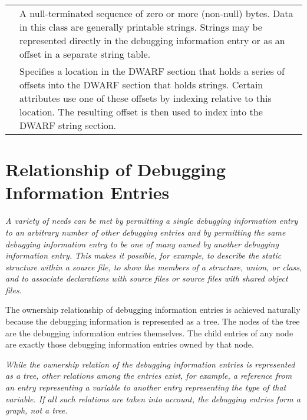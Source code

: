 \begin{longtable}{P{3cm}|P{11cm}}
\hypertarget{chap:classstring}{}
& A null-terminated sequence of zero or more
(non-null) bytes. Data in this class are generally
printable strings. Strings may be represented directly in
the debugging \mbox{information} entry or as an offset in a separate
string table.
\\

\hypertarget{chap:classstroffsetsptr}{}
&Specifies a location in the DWARF section that holds
a series of offsets into the DWARF section that holds strings.
Certain attributes use one of these offsets by indexing 
relative to this location. The resulting offset is then 
used to index into the DWARF string section.
\\

\hline
\end{longtable}

\section{Relationship of Debugging Information Entries}
\label{chap:relationshipofdebugginginformationentries}
\textit{%
A variety of needs can be met by permitting a single
debugging information entry to  an arbitrary number
of other debugging entries and by permitting the same debugging
information entry to be one of many owned by another debugging
information entry. 
This makes it possible, for example, to
describe the static  structure 
within a source file,
to show the members of a structure, union, or class, and to
associate declarations with source files or source files
with shared object files.  
}

The ownership relationship 
of debugging
information entries is achieved naturally because the debugging
information is represented as a tree. The nodes of the tree
are the debugging information entries themselves. 
The child entries of any node are exactly those debugging information
entries owned by that node.  

\textit{%
While the ownership relation
of the debugging information entries is represented as a
tree, other relations among the entries exist, for example,
a reference from an entry representing a variable to another
entry representing the type of that variable. 
If all such
relations are taken into account, the debugging entries
form a graph, not a tree.  
}

